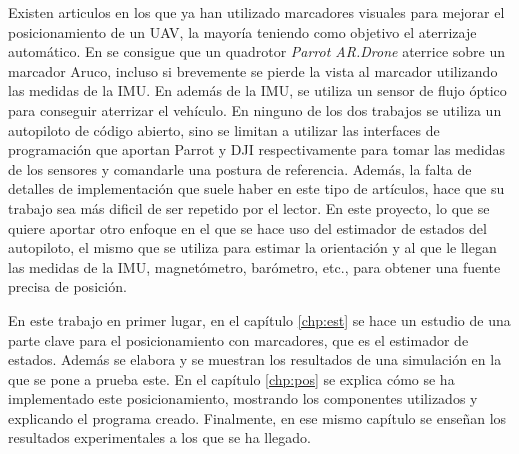 Existen articulos en los que ya han utilizado marcadores visuales para mejorar el posicionamiento de un UAV, la mayoría teniendo como objetivo el aterrizaje automático. En \cite{sani2017automatic} se consigue que un quadrotor \textit{Parrot AR.Drone} aterrice sobre un marcador Aruco, incluso si brevemente se pierde la vista al marcador utilizando las medidas de la IMU. En \cite{yang2015precise} además de la IMU, se utiliza un sensor de flujo óptico para conseguir aterrizar el vehículo. En ninguno de los dos trabajos se utiliza un autopiloto de código abierto, sino se limitan a utilizar las interfaces de programación que aportan Parrot y DJI respectivamente para tomar las medidas de los sensores y comandarle una postura de referencia. 
Además, la falta de detalles de implementación que suele haber en este tipo de artículos, hace que su trabajo sea más dificil de ser repetido por el lector.
En este proyecto, lo que se quiere aportar otro enfoque en el que se hace uso del estimador de estados del autopiloto, el mismo que se utiliza para estimar la orientación y al que le llegan las medidas de la IMU, magnetómetro, barómetro, etc., para obtener una fuente precisa de posición.  

En este trabajo en primer lugar, en el capítulo \ref{chp:est} se hace un estudio de una parte clave para el posicionamiento con marcadores, que es el estimador de estados. Además se elabora y se muestran los resultados de una simulación en la que se pone a prueba este. En el capítulo \ref{chp:pos} se explica cómo se ha implementado este posicionamiento, mostrando los componentes utilizados y explicando el programa creado. Finalmente, en ese mismo capítulo se enseñan los resultados experimentales a los que se ha llegado.  



\endinput
